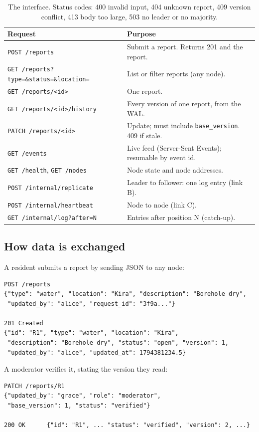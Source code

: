 \documentclass[10pt,a4paper]{article}
\newcommand{\code}[1]{\texttt{#1}}
\begin{document}
\begin{table}[H]
\centering\small
\begin{tabular}{@{}lp{}@{}}
\toprule
Request & Purpose \\
\midrule
\code{POST /reports} & Submit a report. Returns 201 and the report. \\
\code{GET /reports?type=\&status=\&location=} & List or filter reports (any node). \\
\code{GET /reports/<id>} & One report. \\
\code{GET /reports/<id>/history} & Every version of one report, from the WAL. \\
\code{PATCH /reports/<id>} & Update; must include \code{base\_version}. 409 if stale. \\
\code{GET /events} & Live feed (Server-Sent Events); resumable by event id. \\
\code{GET /health}, \code{GET /nodes} & Node state and node addresses. \\
\code{POST /internal/replicate} & Leader to follower: one log entry (link B). \\
\code{POST /internal/heartbeat} & Node to node (link C). \\
\code{GET /internal/log?after=N} & Entries after position N (catch-up). \\
\bottomrule
\end{tabular}
\caption{The interface. Status codes: 400 invalid input, 404 unknown report, 409 version
conflict, 413 body too large, 503 no leader or no majority.}
\end{table}

\subsection{How data is exchanged}

A resident submits a report by sending JSON to any node:
\begin{verbatim}
POST /reports
{"type": "water", "location": "Kira", "description": "Borehole dry",
 "updated_by": "alice", "request_id": "3f9a..."}

201 Created
{"id": "R1", "type": "water", "location": "Kira",
 "description": "Borehole dry", "status": "open", "version": 1,
 "updated_by": "alice", "updated_at": 1794381234.5}
\end{verbatim}

A moderator verifies it, stating the version they read:
\begin{verbatim}
PATCH /reports/R1
{"updated_by": "grace", "role": "moderator",
 "base_version": 1, "status": "verified"}

200 OK      {"id": "R1", ... "status": "verified", "version": 2, ...}
\end{verbatim}
\end{document}
